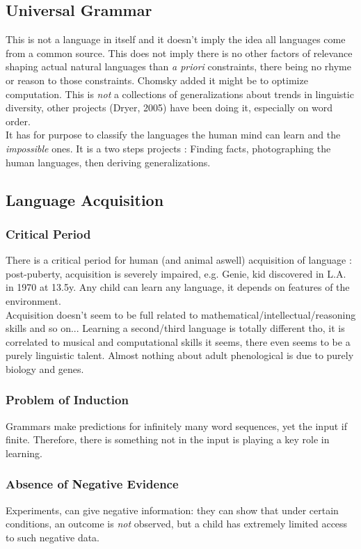 \documentclass{cours}
\begin{document}
\subsection{Universal Grammar}
This is not a language in itself and it doesn't imply the idea all languages come from a common source. This does not imply there is no other factors of relevance shaping actual natural languages than \textsl{a priori} constraints, there being no rhyme or reason to those constraints. Chomsky added it might be to optimize computation. This is \emph{not} a collections of generalizations about trends in linguistic diversity, other projects (Dryer, 2005) have been doing it, especially on word order. \\
It has for purpose to classify the languages the human mind can learn and the \textit{impossible} ones. It is a two steps projects : Finding facts, photographing the human languages, then deriving generalizations.

\subsection{Language Acquisition}
\subsubsection{Critical Period}
There is a critical period for human (and animal aswell) acquisition of language : post-puberty, acquisition is severely impaired, e.g. Genie, kid discovered in L.A. in 1970 at 13.5y. Any child can learn any language, it depends on features of the environment.\\
Acquisition doesn't seem to be full related to mathematical/intellectual/reasoning skills and so on... Learning a second/third language is totally different tho, it is correlated to musical and computational skills it seems, there even seems to be a purely linguistic talent. Almost nothing about adult phenological is due to purely biology and genes. 

\subsubsection{Problem of Induction}
Grammars make predictions for infinitely many word sequences, yet the input if finite. Therefore, there is something not in the input is playing a key role in learning. 

\subsubsection{Absence of Negative Evidence}
Experiments, can give negative information: they can show that under certain conditions, an outcome is \emph{not} observed, but a child has extremely limited access to such negative data.
\end{document}
